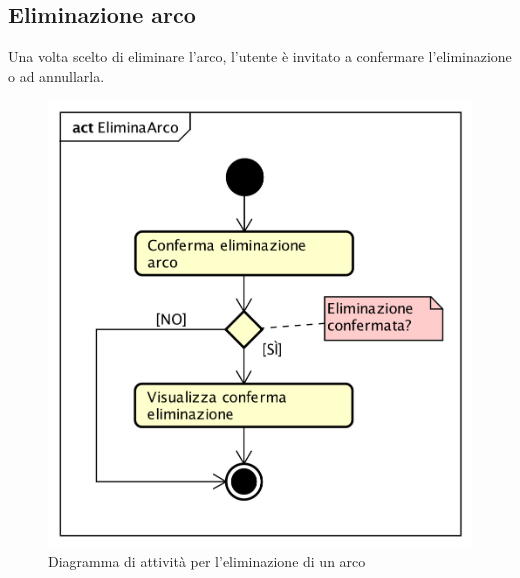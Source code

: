 \newpage
\subsection{Eliminazione arco}
Una volta scelto di eliminare l'arco, l'utente è invitato a confermare l'eliminazione o ad annullarla.
\begin{figure}[H]
	\centering
	\includegraphics[scale=0.7]{img/DiagrammiDiAttivita/EliminazioneArco.png}
	\caption{Diagramma di attività per l'eliminazione di un arco}
\end{figure}

\newpage
